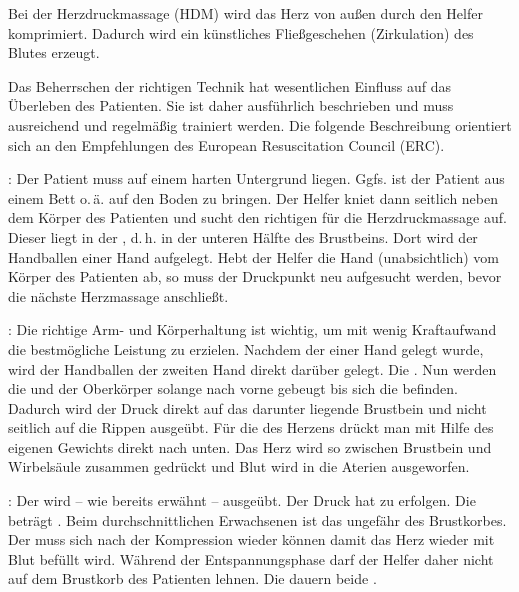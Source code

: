 Bei der Herzdruckmassage (HDM) wird das Herz von außen durch
den Helfer komprimiert. Dadurch wird ein künstliches
Fließgeschehen (Zirkulation) des Blutes erzeugt.


{Das Beherrschen der richtigen Technik hat wesentlichen
Einfluss auf das Überleben des Patienten. Sie ist daher
ausführlich beschrieben und muss ausreichend und regelmäßig
trainiert werden. Die folgende Beschreibung orientiert sich
an den Empfehlungen des European Resuscitation Council
(ERC).

: Der Patient muss auf einem
harten Untergrund liegen. Ggfs. ist der Patient aus einem Bett
o.\,ä. auf den Boden zu bringen. Der Helfer kniet
dann seitlich neben dem Körper des Patienten und sucht
den richtigen  für die Herzdruckmassage
auf. Dieser liegt in der , d.\,h.
in der unteren Hälfte des Brustbeins. Dort wird der
Handballen einer Hand aufgelegt. Hebt der Helfer die Hand
(unabsichtlich) vom Körper des Patienten ab, so muss der
Druckpunkt neu aufgesucht werden, bevor die nächste
Herzmassage anschließt.

: Die richtige Arm- und
Körperhaltung ist wichtig, um mit wenig Kraftaufwand die
bestmögliche Leistung zu erzielen. Nachdem der
 einer Hand  gelegt
wurde, wird der Handballen der zweiten Hand direkt darüber
gelegt. Die . Nun
werden die  und der Oberkörper
solange nach vorne gebeugt bis sich die  befinden. Dadurch wird der Druck direkt
auf das darunter liegende Brustbein und nicht seitlich auf
die Rippen ausgeübt. Für die  des Herzens
drückt man mit Hilfe des eigenen Gewichts direkt nach unten.
Das Herz wird so zwischen Brustbein und Wirbelsäule zusammen
gedrückt und Blut wird in die Aterien ausgeworfen.

: Der  wird
-- wie bereits erwähnt --  ausgeübt.
Der Druck hat  zu erfolgen.
Die  beträgt . Beim
durchschnittlichen Erwachsenen ist das ungefähr
 des Brustkorbes. Der  muss sich
nach der Kompression wieder  können
damit das Herz wieder mit Blut befüllt wird. Während der
Entspannungsphase darf der Helfer daher nicht auf dem
Brustkorb des Patienten lehnen. Die  dauern beide 
\cite{Erc2010Sec2}.

}
